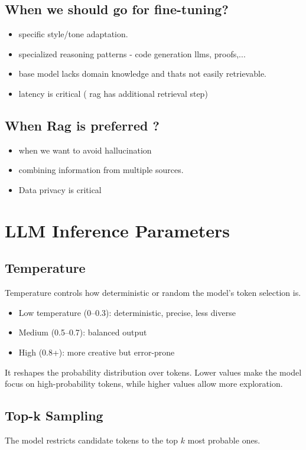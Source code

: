 \documentclass[10pt,a4paper]{article}
\begin{document}
\subsection{When we should go for fine-tuning?}
\begin{itemize}
  \item
    specific style/tone adaptation.
  \item
    specialized reasoning patterns - code generation llms, proofs,...
  \item
    base model lacks domain knowledge and thats not easily retrievable.
  \item
    latency is critical ( rag has additional retrieval step)
\end{itemize}

\subsection{When Rag is preferred ?}
\begin{itemize}
  \item
    when we want to avoid hallucination
  \item
    combining information from multiple sources.
  \item
    Data privacy is critical
\end{itemize}

\section{LLM Inference Parameters}

\subsection{Temperature}
Temperature controls how deterministic or random the model's token selection is.

\begin{itemize}
    \item Low temperature (0--0.3): deterministic, precise, less diverse
    \item Medium (0.5--0.7): balanced output
    \item High (0.8+): more creative but error-prone
\end{itemize}

It reshapes the probability distribution over tokens. Lower values make the model focus on high-probability tokens, while higher values allow more exploration.

\subsection{Top-k Sampling}
The model restricts candidate tokens to the top $k$ most probable ones.
\end{document}
